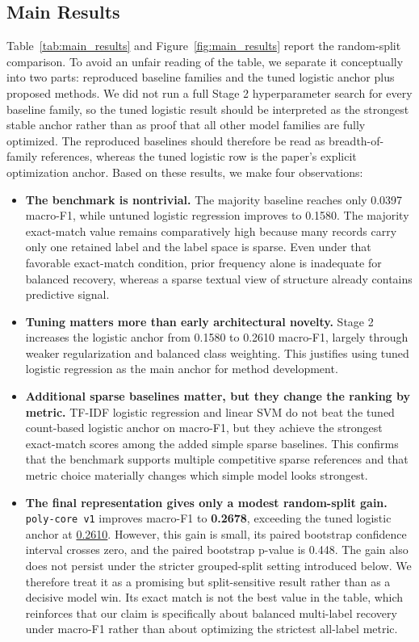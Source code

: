 \documentclass{article}
\newcommand{\best}[1]{\textcolor{bestred}{\textbf{#1}}}
\newcommand{\second}[1]{\textcolor{secondblue}{\underline{#1}}}
\begin{document}
\subsection{Main Results}

Table~\ref{tab:main_results} and Figure~\ref{fig:main_results} report the random-split comparison. To avoid an unfair reading of the table, we separate it conceptually into two parts: reproduced baseline families and the tuned logistic anchor plus proposed methods. We did not run a full Stage 2 hyperparameter search for every baseline family, so the tuned logistic result should be interpreted as the strongest stable anchor rather than as proof that all other model families are fully optimized. The reproduced baselines should therefore be read as breadth-of-family references, whereas the tuned logistic row is the paper's explicit optimization anchor. Based on these results, we make four observations:
\begin{itemize}[leftmargin=*,nosep]
\item \textbf{The benchmark is nontrivial.} The majority baseline reaches only 0.0397 macro-F1, while untuned logistic regression improves to 0.1580. The majority exact-match value remains comparatively high because many records carry only one retained label and the label space is sparse. Even under that favorable exact-match condition, prior frequency alone is inadequate for balanced recovery, whereas a sparse textual view of structure already contains predictive signal.
\item \textbf{Tuning matters more than early architectural novelty.} Stage 2 increases the logistic anchor from 0.1580 to 0.2610 macro-F1, largely through weaker regularization and balanced class weighting. This justifies using tuned logistic regression as the main anchor for method development.
\item \textbf{Additional sparse baselines matter, but they change the ranking by metric.} TF-IDF logistic regression and linear SVM do not beat the tuned count-based logistic anchor on macro-F1, but they achieve the strongest exact-match scores among the added simple sparse baselines. This confirms that the benchmark supports multiple competitive sparse references and that metric choice materially changes which simple model looks strongest.
\item \textbf{The final representation gives only a modest random-split gain.} \texttt{poly-core v1} improves macro-F1 to \best{0.2678}, exceeding the tuned logistic anchor at \second{0.2610}. However, this gain is small, its paired bootstrap confidence interval crosses zero, and the paired bootstrap p-value is 0.448. The gain also does not persist under the stricter grouped-split setting introduced below. We therefore treat it as a promising but split-sensitive result rather than as a decisive model win. Its exact match is not the best value in the table, which reinforces that our claim is specifically about balanced multi-label recovery under macro-F1 rather than about optimizing the strictest all-label metric.
\end{itemize}
\end{document}
